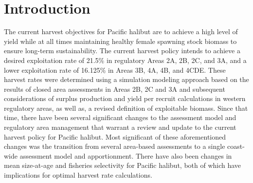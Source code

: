 % 








\section*{Introduction} %
\label{sec:introduction}
The current harvest objectives for Pacific halibut are to achieve a high level of yield while at all times maintaining healthy female spawning stock biomass to ensure long-term sustainability. The current harvest policy intends to achieve a desired exploitation rate of 21.5\% in regulatory Areas 2A, 2B, 2C, and 3A, and a lower exploitation rate of 16.125\% in Areas 3B, 4A, 4B, and 4CDE.  These harvest rates were determined using a simulation modeling approach based on the results of closed area assessments in Areas 2B, 2C and 3A \citep{clark2006assessment} and subsequent considerations of surplus production and yield per recruit calculations in western regulatory areas, as well as, a revised definition of exploitable biomass.  Since that time, there have been several significant changes to the assessment model and regulatory area management that warrant a review and update to the current harvest policy for Pacific halibut.  Most significant of these aforementioned changes was the transition from several area-based assessments to a single coast-wide assessment model and  apportionment. There have also been changes in mean size-at-age and fisheries selectivity for Pacific halibut, both of which have implications for optimal harvest rate calculations.

